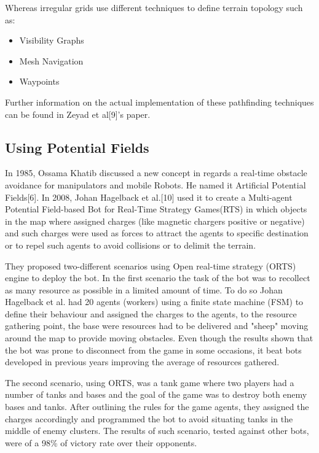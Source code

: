 \vspace{2mm}
Whereas irregular grids use different techniques to define terrain topology such as:

\begin{itemize}
	\item Visibility Graphs
	\item Mesh Navigation
	\item Waypoints
\end{itemize}

\vspace{2mm}
Further information on the actual implementation of these pathfinding techniques can be found in Zeyad et al[9]'s paper.


\subsection{Using Potential Fields}

In 1985, Ossama Khatib discussed a new concept in regards a real-time obstacle avoidance for manipulators and mobile Robots. He named it Artificial Potential Fields[6]. In 2008, Johan Hagelback et al.[10] used it to create a Multi-agent Potential Field-based Bot for Real-Time Strategy Games(RTS) in which objects in the map where assigned charges (like magnetic chargers positive or negative) and such charges were used as forces to attract the agents to specific destination or to repel such agents to avoid collisions or to delimit the terrain.

\vspace{2mm}
They proposed two-different scenarios using Open real-time strategy (ORTS) engine to deploy the bot. In the first scenario the task of the bot was to recollect as many resource as possible in a limited amount of time. To do so Johan Hagelback et al. had 20 agents (workers) using a finite state machine (FSM) to define their behaviour and assigned the charges to the agents, to the resource gathering point, the base were resources had to be delivered and "sheep" moving around the map to provide moving obstacles. Even though the results shown that the bot was prone to disconnect from the game in some occasions, it beat bots developed in previous years improving the average of resources gathered.

\vspace{2mm}
The second scenario, using ORTS, was a tank game where two players had a number of tanks and bases and the goal of the game was to destroy both enemy bases and tanks. After outlining the rules for the game agents, they assigned the charges accordingly and programmed the bot to avoid situating tanks in the middle of enemy clusters. The results of such scenario, tested against other bots, were of a 98\% of victory rate over their opponents.


